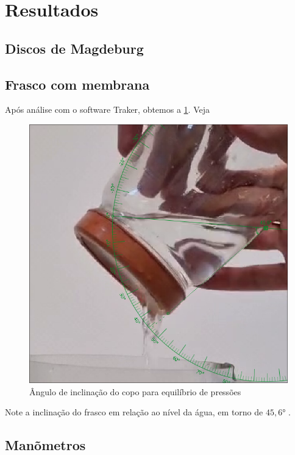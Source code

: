 \section{Resultados}
\subsection{Discos de Magdeburg}
\subsection{Frasco com membrana}

Após análise com o software Traker, obtemos a \cref{copo.png}. Veja

\begin{figure}[H]
    \centering
    \includegraphics[width=.5\linewidth]{fig/copo.png}
    \caption{Ângulo de inclinação do copo para equilíbrio de pressões}
    \label{copo.png}
\end{figure}

Note a inclinação do frasco em relação ao nível da água, em torno de \( 45,6 \)° .

\subsection{Manõmetros}
